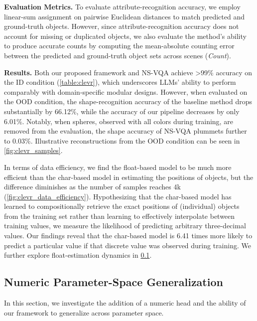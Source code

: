 

\noindent\textbf{Evaluation Metrics.}
To evaluate attribute-recognition accuracy, we employ linear-sum assignment on pairwise Euclidean distances to match predicted and ground-truth objects.
However, since attribute-recognition accuracy does not account for missing or duplicated objects, we also evaluate the method's ability to produce accurate counts by computing the mean-absolute counting error between the predicted and ground-truth object sets across scenes (\textit{Count}).


\noindent\textbf{Results.}
Both our proposed framework and NS-VQA achieve \textgreater 99\% accuracy on the ID condition (\cref{table:clevr}), which underscores LLMs' ability to perform comparably with domain-specific modular designs.
However, when evaluated on the OOD condition, the shape-recognition accuracy of the baseline method drops substantially by 66.12\%, while the accuracy of our pipeline decreases by only 6.01\%.
Notably, when spheres, observed with all colors during training, are removed from the evaluation, the shape accuracy of NS-VQA plummets further to 0.03\%.
Illustrative reconstructions from the OOD condition can be seen in \cref{fig:clevr_samples}.

In terms of data efficiency, we find the float-based model to be much more efficient than the char-based model in estimating the positions of objects, but the difference diminishes as the number of samples reaches 4k (\cref{fig:clevr_data_efficiency}).
Hypothesizing that the char-based model has learned to compositionally retrieve the exact positions of (individual) objects from the training set rather than learning to effectively interpolate between training values, we measure 
the likelihood of predicting arbitrary three-decimal values.
Our findings reveal that the char-based model is 6.41 times more likely to predict a particular value if that discrete value was observed during training.
We further explore float-estimation dynamics in \cref{ssec:parameter_space_generalization}.

\subsection{Numeric Parameter-Space Generalization}\label{ssec:parameter_space_generalization}
In this section, we investigate the addition of a numeric head and the ability of our framework to generalize across parameter space.

